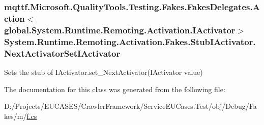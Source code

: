 \hypertarget{class_system_1_1_runtime_1_1_remoting_1_1_activation_1_1_fakes_1_1_stub_i_activator_aad7783c610e0eb721ec81f11cbf0254c}{
\subsubsection[{Next\-Activator\-Set\-I\-Activator}]{\setlength{\rightskip}{0pt plus 5cm}mqttf.\-Microsoft.\-Quality\-Tools.\-Testing.\-Fakes.\-Fakes\-Delegates.\-Action$<$global.\-System.\-Runtime.\-Remoting.\-Activation.\-I\-Activator$>$ System.\-Runtime.\-Remoting.\-Activation.\-Fakes.\-Stub\-I\-Activator.\-Next\-Activator\-Set\-I\-Activator}}\label{class_system_1_1_runtime_1_1_remoting_1_1_activation_1_1_fakes_1_1_stub_i_activator_aad7783c610e0eb721ec81f11cbf0254c}


Sets the stub of I\-Activator.\-set\-\_\-\-Next\-Activator(\-I\-Activator value)



The documentation for this class was generated from the following file\-:\begin{DoxyCompactItemize}
\item 
D\-:/\-Projects/\-E\-U\-C\-A\-S\-E\-S/\-Crawler\-Framework/\-Service\-E\-U\-Cases.\-Test/obj/\-Debug/\-Fakes/m/\hyperlink{m_2f_8cs}{f.\-cs}\end{DoxyCompactItemize}
